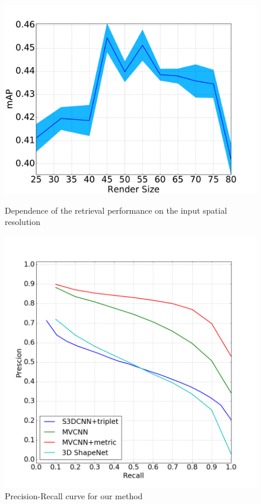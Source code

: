 \begin{figure}[!tbp]
\vspace{-20pt}
\centering
\begin{minipage}[b]{0.45\textwidth}
  \centering
  \includegraphics[width=\columnwidth]{Figures/shape_retrieval/new_map_to_rs.pdf}
  \caption{Dependence of the retrieval performance on the input spatial resolution}
  \label{fig:map_for_rs}
\end{minipage}
\begin{minipage}[b]{0.45\textwidth}
  \centering
  \includegraphics[width=\columnwidth]{Figures/shape_retrieval/pr_curves_comp}
  \caption{Precision-Recall curve for our method}
  \label{fig:pr_curve}
\end{minipage}
\end{figure}


